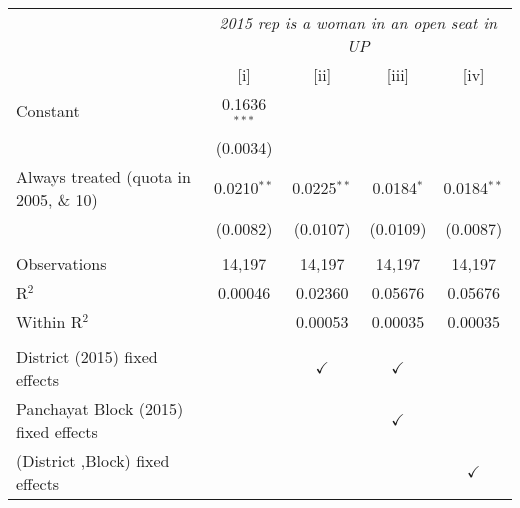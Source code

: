 
\begingroup
\centering
\begin{tabular}{lcccc}
   \toprule
    & \multicolumn{4}{c}{\textit{2015 rep is a woman in an open seat in UP}}\\
                                          & [i]            & [ii]          & [iii]         & [iv]\\  
   \midrule 
   Constant                               & 0.1636$^{***}$ &               &               &   \\   
                                          & (0.0034)       &               &               &   \\   
   Always treated (quota in 2005, \& 10)  & 0.0210$^{**}$  & 0.0225$^{**}$ & 0.0184$^{*}$  & 0.0184$^{**}$\\   
                                          & (0.0082)       & (0.0107)      & (0.0109)      & (0.0087)\\   
    \\
   Observations                           & 14,197         & 14,197        & 14,197        & 14,197\\  
   R$^2$                                  & 0.00046        & 0.02360       & 0.05676       & 0.05676\\  
   Within R$^2$                           &                & 0.00053       & 0.00035       & 0.00035\\  
    \\
   District (2015) fixed effects          &                & $\checkmark$  & $\checkmark$  & \\  
   Panchayat Block (2015) fixed effects   &                &               & $\checkmark$  & \\  
   (District ,Block) fixed effects        &                &               &               & $\checkmark$\\   
   \bottomrule
\end{tabular}
\par\endgroup


